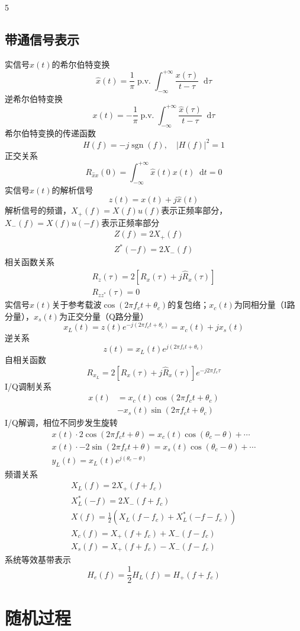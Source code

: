 \documentclass[8pt, a4paper]{extarticle}
\newcommand*{\dif}{\mathop{}\!\mathrm{d}}
\DeclareMathOperator{\pv}{p.v.}
\DeclareMathOperator{\sgn}{sgn}
\begin{document}
\begin{multicols}{5}
\subsection{带通信号表示}
实信号\(x(t)\)的希尔伯特变换
\[
\hat{x}(t) = \frac{1}{\pi}\pv\int_{-\infty}^{+\infty}\frac{x(\tau)}{t-\tau}\dif \tau
\]
逆希尔伯特变换
\[
x(t) = -\frac{1}{\pi}\pv\int_{-\infty}^{+\infty}\frac{\hat{x}(\tau)}{t-\tau}\dif \tau
\]
希尔伯特变换的传递函数
\[
H(f) = -j\sgn(f),\quad |H(f)|^2 = 1
\]
正交关系
\[
R_{\hat{x}x}(0) = \int_{-\infty}^{+\infty}\hat{x}(t)x(t)\dif t = 0
\]
实信号\(x(t)\)的解析信号
\[
z(t) =x(t)+j\hat{x}(t)
\]
解析信号的频谱，\(X_+(f)=X(f)u(f)\)表示正频率部分，\(X_-(f)=X(f)u(-f)\)表示正频率部分
\begin{gather*}
Z(f)=2X_+(f)\\
Z^*(-f)=2X_-(f)
\end{gather*}
相关函数关系
\begin{gather*}
R_z(\tau)=2[R_x(\tau)+j\hat{R}_x(\tau)]\\
R_{zz^*}(\tau)=0
\end{gather*}
实信号\(x(t)\)关于参考载波\(\cos(2\pi f_c t +\theta_c)\)的复包络；\(x_c(t)\)为同相分量（I路分量），\(x_s(t)\)为正交分量（Q路分量）
\[
x_L(t) = z(t)e^{-j(2\pi f_c t+\theta_c)} = x_c(t) + jx_s(t)
\]
逆关系
\[
z(t) = x_L(t)e^{j(2\pi f_c t+\theta_c)}
\]
自相关函数
\[
R_{x_L} = 2[R_x(\tau)+j\hat{R}_x(\tau)]e^{-j2\pi f_c \tau}
\]
I/Q调制关系
\begin{align*}
x(t)&=x_c(t)\cos(2\pi f_c t+\theta_c)\\
&-x_s(t)\sin(2\pi f_c t+\theta_c)
\end{align*}
I/Q解调，相位不同步发生旋转
\begin{gather*}
x(t)\cdot 2\cos(2\pi f_c t+\theta) = x_c(t)\cos(\theta_c-\theta) + \cdots\\
x(t)\cdot -2\sin(2\pi f_c t+\theta) = x_s(t)\cos(\theta_c-\theta) + \cdots\\
y_L(t) = x_L(t)e^{j(\theta_c-\theta)}
\end{gather*}
频谱关系
\begin{gather*}
X_L(f) = 2X_+(f+f_c)\\
X_L^*(-f) = 2X_-(f+f_c)\\
X(f) = \frac{1}{2}\left(X_L(f-f_c) + X_L^*(-f-f_c)\right)\\
X_c(f) = X_+(f+f_c) + X_-(f-f_c)\\
X_s(f) = X_+(f+f_c) - X_-(f-f_c)
\end{gather*}
系统等效基带表示
\[
H_e(f) = \frac{1}{2}H_L(f) = H_+(f+f_c)
\]
\section{随机过程}

\end{multicols}
\end{document}

